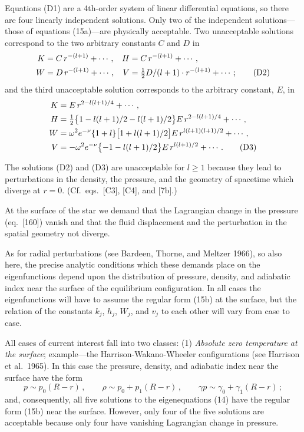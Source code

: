 \documentclass[12pt]{article}
\begin{document}
Equations (D1) are a 4th-order system of linear differential equations, so there are four
linearly independent solutions. Only two of the independent solutions---those of equations
(15a)---are physically acceptable. Two unacceptable solutions correspond to the two arbitrary
constants $C$ and $D$ in
%
\begin{align}
K &= C\,r^{-(l+1)} + \cdots \,, & H &= C\,r^{-(l+1)} + \cdots \,,
\notag \\
W &= D\,r^{-(l+1)} + \cdots \,, & V &= \tfrac{1}{2} D/(l+1)\cdot r^{-(l+1)} + \cdots \,;
\tag{D2}
\end{align}
%
and the third unacceptable solution corresponds to the arbitrary constant, $E$, in
%
\begin{align}
K &= E\,r^{2-l(l+1)/4} + \cdots \,, \notag \\
H &= \tfrac{1}{2}\bigl\{1 - l(l+1)/2 - l(l+1)/2\bigr\} E\,r^{2-l(l+1)/4} + \cdots \,, \notag \\
W &= \omega^2 e^{-\nu}\{1+l\}\bigl[1 + l(l+1)/2\bigr] E\,r^{l(l+1)(l+1)/2} + \cdots \,, \notag \\
V &= -\omega^2 e^{-\nu}\bigl\{-1 - l(l+1)/2\bigr\} E\,r^{l(l+1)/2} + \cdots \,.
\tag{D3}
\end{align}

The solutions (D2) and (D3) are unacceptable for $l \geq 1$ because they lead to perturbations
in the density, the pressure, and the geometry of spacetime which diverge at $r = 0$. (Cf.\ eqs.\
[C3], [C4], and [7b].)

At the surface of the star we demand that the Lagrangian change in the pressure (eq.\ [160])
vanish and that the fluid displacement and the perturbation in the spatial geometry not diverge.

As for
radial perturbations (see Bardeen, Thorne, and Meltzer 1966), so also here, the precise analytic
conditions which these demands place on the eigenfunctions depend upon the distribution of
pressure, density, and adiabatic index near the surface of the equilibrium configuration. In all
cases the eigenfunctions will have to assume the regular form (15b) at the surface, but the
relation of the constants $k_j$, $h_j$, $W_j$, and $v_j$ to each other will vary from case to case.

All cases of current interest fall into two classes: (1) \textit{Absolute zero temperature at the
surface}; example---the Harrison-Wakano-Wheeler configurations (see Harrison et al.\ 1965). In
this case the pressure, density, and adiabatic index near the surface have the form
%
\begin{equation}
p \sim p_0(R - r) \,, \qquad
\rho \sim p_0 + p_1(R - r) \,, \qquad
\gamma p \sim \gamma_0 + \gamma_1(R - r) \,;
\tag{D4}
\end{equation}
%
and, consequently, all five solutions to the eigenequations (14) have the regular form (15b) near
the surface. However, only four of the five solutions are acceptable because only four have
vanishing Lagrangian change in pressure.
\end{document}
